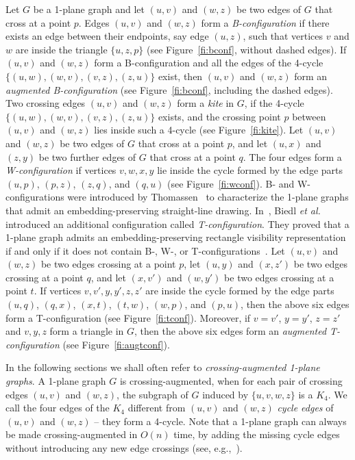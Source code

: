 \documentclass{article}
\begin{document}
Let $G$ be a 1-plane graph and let $(u,v)$ and $(w,z)$ be two edges of $G$ that cross at a point $p$.  Edges $(u,v)$ and $(w,z)$ form a {\em B-configuration} if there exists an edge between their endpoints, say edge $(u,z)$, such that vertices $v$ and $w$ are inside the triangle $\{u,z,p\}$ (see  Figure~\ref{fi:bconf}, without dashed edges). If $(u,v)$ and $(w,z)$ form a B-configuration and all the edges of the 4-cycle $\{(u,w), (w,v), (v,z), (z,u)\}$ exist, then $(u,v)$ and $(w,z)$ form an \emph{augmented B-configuration} (see Figure~\ref{fi:bconf}, including the dashed edges). Two crossing edges $(u,v)$ and $(w,z)$ form a \emph{kite} in $G$, if the 4-cycle $\{(u,w), (w,v), (v,z), (z,u)\}$ exists, and the crossing point $p$ between $(u,v)$ and $(w,z)$ lies inside such a 4-cycle (see Figure~\ref{fi:kite}). Let $(u,v)$ and $(w,z)$ be two edges of $G$ that cross at a point $p$, and let $(u,x)$ and $(z,y)$ be two further edges of $G$ that cross at a point $q$. The four edges form a \emph{W-configuration} if vertices $v,w,x,y$ lie inside the cycle formed by the edge parts $(u,p)$, $(p,z)$, $(z,q)$, and $(q,u)$ (see Figure~\ref{fi:wconf}). B- and W-configurations were introduced by Thomassen~\cite{t-rdg-JGT88} to characterize the 1-plane graphs that admit an embedding-preserving straight-line drawing. In~\cite{SoCG}, Biedl {\em et al.} introduced an additional configuration called \emph{T-configuration}. They proved that a 1-plane graph admits an embedding-preserving rectangle visibility representation if and only if it does not contain B-, W-, or T-configurations~\cite{SoCG}. Let $(u,v)$ and $(w,z)$ be two edges crossing at a point $p$, let  $(u,y)$ and $(x,z')$ be two edges crossing at a point $q$, and let $(x,v')$ and $(w,y')$ be two edges crossing at a point $t$. If vertices $v,v',y,y',z,z'$ are inside the cycle formed by the edge parts $(u,q)$, $(q,x)$, $(x,t)$, $(t,w)$, $(w,p)$, and $(p,u)$, then the above six edges form a T-configuration (see Figure~\ref{fi:tconf}). Moreover, if $v=v'$, $y=y'$, $z=z'$ and $v,y,z$ form a triangle in $G$, then the above six edges form an \emph{augmented T-configuration} (see Figure~\ref{fi:augtconf}).

In the following sections we shall often refer to \emph{crossing-augmented 1-plane graphs}. A 1-plane graph $G$ is crossing-augmented, when for each pair of crossing edges $(u,v)$ and $(w,z)$, the subgraph of $G$ induced by $\{u,v,w,z\}$ is a $K_4$. We call  the four edges of the $K_4$ different from $(u,v)$ and $(w,z)$ \emph{cycle edges} of $(u,v)$ and $(w,z)$  -- they form a 4-cycle. Note that a 1-plane graph can always be made crossing-augmented in $O(n)$ time, by adding the missing cycle edges without introducing any new edge crossings (see, e.g.,~\cite{DBLP:conf/gd/AlamBK13,Suzuki2010}). 
\end{document}
